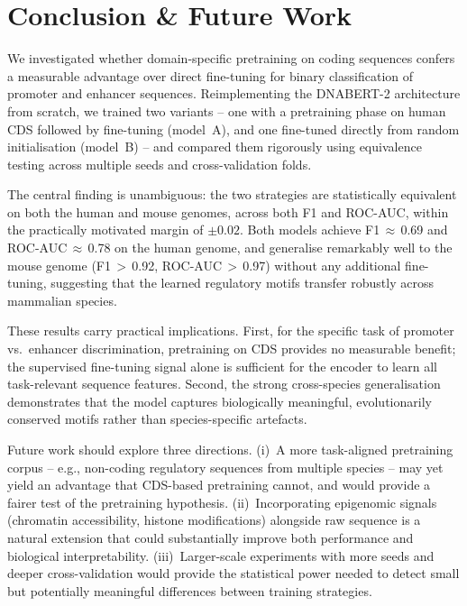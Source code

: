 \documentclass[11pt,a4paper,twoside]{article}
\begin{document}
\section{Conclusion \& Future Work}
\label{sec:conclusion}

We investigated whether domain-specific pretraining on coding sequences confers a measurable advantage over direct fine-tuning for binary classification of promoter and enhancer sequences.
Reimplementing the DNABERT-2 architecture from scratch, we trained two variants -- one with a pretraining phase on human CDS followed by fine-tuning (model~A), and one fine-tuned directly from random initialisation (model~B) -- and compared them rigorously using equivalence testing across multiple seeds and cross-validation folds.

The central finding is unambiguous: the two strategies are statistically equivalent on both the human and mouse genomes, across both F1 and ROC-AUC, within the practically motivated margin of $\pm 0.02$.
Both models achieve F1\,$\approx$\,0.69 and ROC-AUC\,$\approx$\,0.78 on the human genome, and generalise remarkably well to the mouse genome (F1\,$>$\,0.92, ROC-AUC\,$>$\,0.97) without any additional fine-tuning, suggesting that the learned regulatory motifs transfer robustly across mammalian species.

These results carry practical implications.
First, for the specific task of promoter vs.\ enhancer discrimination, pretraining on CDS provides no measurable benefit; the supervised fine-tuning signal alone is sufficient for the encoder to learn all task-relevant sequence features.
Second, the strong cross-species generalisation demonstrates that the model captures biologically meaningful, evolutionarily conserved motifs rather than species-specific artefacts.

Future work should explore three directions.
(i)~A more task-aligned pretraining corpus -- e.g., non-coding regulatory sequences from multiple species -- may yet yield an advantage that CDS-based pretraining cannot, and would provide a fairer test of the pretraining hypothesis.
(ii)~Incorporating epigenomic signals (chromatin accessibility, histone modifications) alongside raw sequence is a natural extension that could substantially improve both performance and biological interpretability.
(iii)~Larger-scale experiments with more seeds and deeper cross-validation would provide the statistical power needed to detect small but potentially meaningful differences between training strategies.

\newpage
\printbibliography
\end{document}
